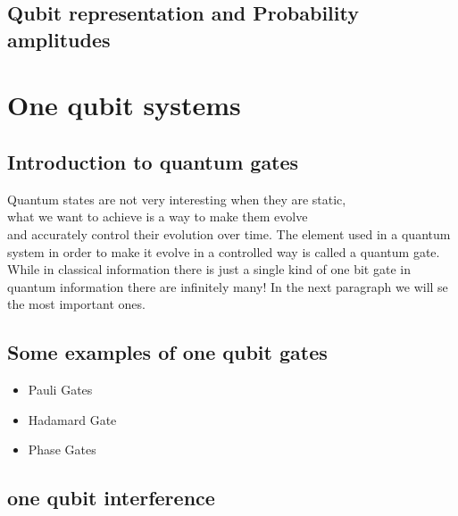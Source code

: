\documentclass{article}
\begin{document}
\subsection{Qubit representation and Probability amplitudes}


\section{One qubit systems}


\subsection{Introduction to quantum gates}
Quantum states are not very interesting when they are static, \\
what we want to achieve is a way to make them evolve\\
and accurately control their evolution over time.
The element used in a quantum system in order to make it evolve
in a controlled way is called a quantum gate.\\
While in classical information there is just a single kind of one bit
gate in quantum information there are infinitely many!
In the next paragraph we will se the most important ones.

\subsection{Some examples of one qubit gates}

\begin{itemize}

\item
  Pauli Gates

\item
  Hadamard Gate
  
\item
  Phase Gates
  
\end{itemize}

\subsection{one qubit interference}

\end{document}
